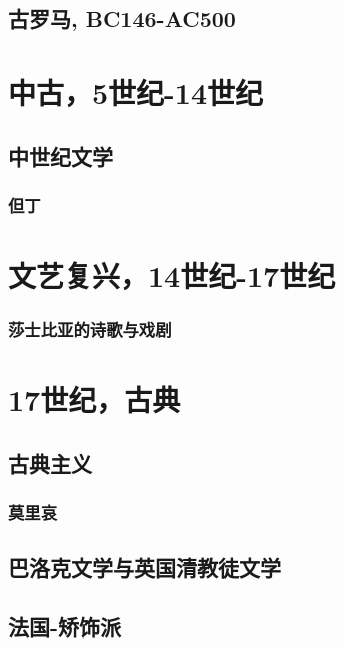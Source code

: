 \documentclass[UTF8]{../RepresentationUniverse}
\begin{document}
\section{古罗马, BC146-AC500}






\chapter{中古，5世纪-14世纪}
\section{中世纪文学}


\subsection{但丁}



\chapter{文艺复兴，14世纪-17世纪}



\subsection{莎士比亚的诗歌与戏剧}





\chapter{17世纪，古典}

\section{古典主义}

\subsection{莫里哀}

\section{巴洛克文学与英国清教徒文学}


\section{法国-矫饰派}
\end{document}

